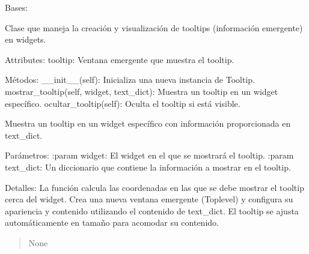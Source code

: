 \documentclass[letterpaper,10pt,spanish]{sphinxmanual}
\begin{document}
\begin{fulllineitems}
\label{\detokenize{tooltip:tooltip.Tooltip}}
\pysigstartsignatures
{}
\pysigstopsignatures
\sphinxAtStartPar
Bases: 

\sphinxAtStartPar
Clase que maneja la creación y visualización de tooltips (información emergente) en widgets.

\sphinxAtStartPar
Attributes:
\sphinxhyphen{} tooltip: Ventana emergente que muestra el tooltip.

\sphinxAtStartPar
Métodos:
\sphinxhyphen{} \_\_init\_\_(self): Inicializa una nueva instancia de Tooltip.
\sphinxhyphen{} mostrar\_tooltip(self, widget, text\_dict): Muestra un tooltip en un widget específico.
\sphinxhyphen{} ocultar\_tooltip(self): Oculta el tooltip si está visible.

\begin{fulllineitems}
\label{\detokenize{tooltip:tooltip.Tooltip.mostrar_tooltip}}
\pysigstartsignatures
{}
\pysigstopsignatures
\sphinxAtStartPar
Muestra un tooltip en un widget específico con información proporcionada en text\_dict.

\sphinxAtStartPar
Parámetros:
:param widget: El widget en el que se mostrará el tooltip.
:param text\_dict: Un diccionario que contiene la información a mostrar en el tooltip.

\sphinxAtStartPar
Detalles:
La función calcula las coordenadas en las que se debe mostrar el tooltip cerca del widget.
Crea una nueva ventana emergente (Toplevel) y configura su apariencia y contenido utilizando
el contenido de text\_dict. El tooltip se ajusta automáticamente en tamaño para acomodar su contenido.
\begin{quote}\begin{description}
\sphinxAtStartPar
None

\end{description}\end{quote}

\end{fulllineitems}


\end{fulllineitems}
\end{document}
